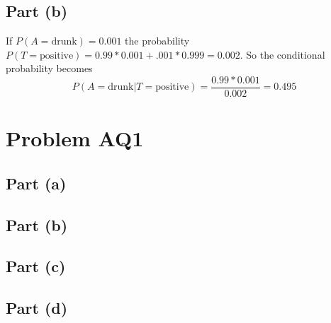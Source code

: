 \documentclass[11pt]{article}
\begin{document}
\subsection*{Part (b)}
If $P(A=\text{drunk})=0.001$ the probability $P(T=\text{positive})=0.99*0.001+.001*0.999=0.002$. So the conditional probability becomes
\begin{equation*}
	P(A=\text{drunk}|T=\text{positive}) = \frac{0.99*0.001}{0.002} = 0.495
\end{equation*}

\section*{Problem AQ1}

\subsection*{Part (a)}
\subsection*{Part (b)}
\subsection*{Part (c)}
\subsection*{Part (d)}
\end{document}
